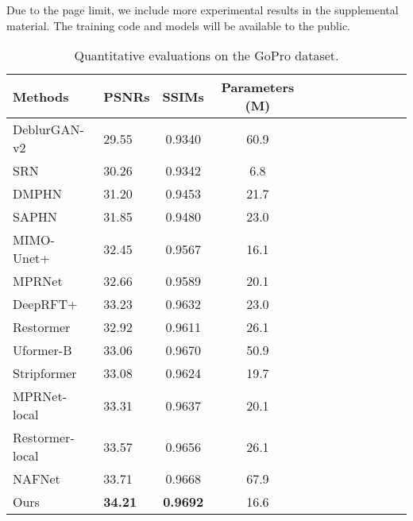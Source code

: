 \documentclass[10pt,twocolumn,letterpaper]{article}
\begin{document}
Due to the page limit, we include more experimental results in the supplemental material. The training code and models will be available to the public.
\begin{table}[!t] \footnotesize
\centering
    \caption{Quantitative evaluations on the GoPro dataset\cite{GoPro}.}
    \label{tab:GoPro}
    \vspace{-2mm}
    \begin{tabular}{*{2}{l}*{10}{c}}
        \toprule
       Methods & PSNRs &  SSIMs & Parameters (M) & \\
        \midrule
        DeblurGAN-v2~\cite{DeblurGANv2}      & 29.55 & 0.9340  & 60.9 \\
        SRN~\cite{SRN}                       & 30.26 & 0.9342 & 6.8  \\
        DMPHN~\cite{DMPHN}                   & 31.20 & 0.9453 & 21.7 \\
        SAPHN~\cite{SAPHN}                   & 31.85 & 0.9480 & 23.0 \\
        MIMO-Unet+~\cite{MIMO}               & 32.45 & 0.9567 & 16.1 \\
        MPRNet~\cite{MPRNet}                 & 32.66 & 0.9589 & 20.1 \\
DeepRFT+~\cite{Deeprft}              & 33.23 & 0.9632 & 23.0\\
        Restormer~\cite{Restormer}           & 32.92 & 0.9611 & 26.1 \\
        Uformer-B~\cite{Uformer}             & 33.06 & 0.9670 & 50.9 \\
        Stripformer~\cite{Stripformer}       & 33.08 & 0.9624 & 19.7 \\
        MPRNet-local~\cite{TLC}              & 33.31 & 0.9637 & 20.1 \\
        Restormer-local~\cite{TLC}           & 33.57 & 0.9656 & 26.1 \\
        NAFNet~\cite{NAFNet}                 & 33.71 & 0.9668 & 67.9 \\
        Ours                                 & \textbf{34.21} & \textbf{0.9692} & 16.6 \\
        \bottomrule
    \end{tabular}
  \vspace{-5mm}
\end{table}
\end{document}
